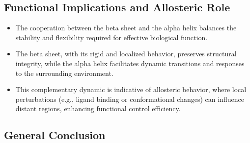 \documentclass[English, Lau, oneside]{sapthesis}
\begin{document}
\subsection{Functional Implications and Allosteric Role}

\begin{itemize}
    \item The cooperation between the beta sheet and the alpha helix balances the stability and flexibility required for effective biological function.
    \item The beta sheet, with its rigid and localized behavior, preserves structural integrity, while the alpha helix facilitates dynamic transitions and responses to the surrounding environment.
    \item This complementary dynamic is indicative of allosteric behavior, where local perturbations (e.g., ligand binding or conformational changes) can influence distant regions, enhancing functional control efficiency.
\end{itemize}

\subsection{General Conclusion}
\end{document}
